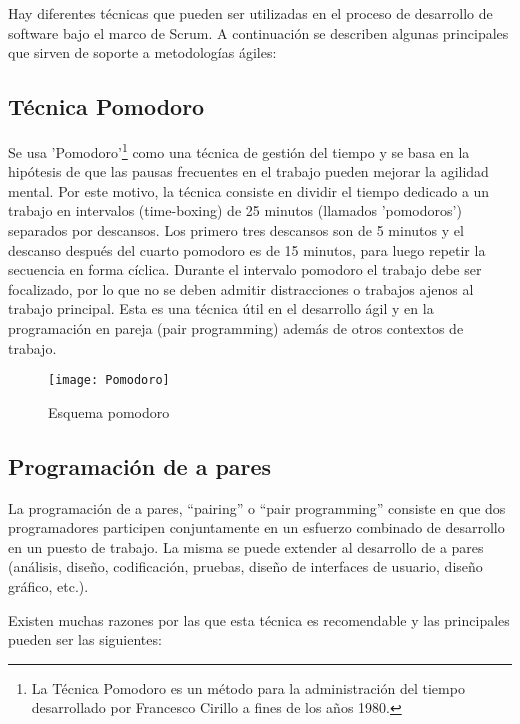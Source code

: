 Hay diferentes técnicas que pueden ser utilizadas en el proceso de desarrollo de software bajo el marco de Scrum. A continuación se describen algunas principales que sirven de soporte a metodologías ágiles:

\subsection{Técnica Pomodoro}

Se usa 'Pomodoro'\footnote{La Técnica Pomodoro es un método para la administración del tiempo desarrollado por Francesco Cirillo a fines de los años 1980\cite{Cirillo-Francesco-1980}.} como una técnica de gestión del tiempo y se basa en la hipótesis de que las pausas frecuentes en el trabajo pueden mejorar la agilidad mental. Por este motivo, la técnica consiste en dividir el tiempo dedicado a un trabajo en intervalos (time-boxing) de 25 minutos (llamados 'pomodoros') separados por descansos. Los primero tres descansos son de 5 minutos y el descanso después del cuarto pomodoro es de 15 minutos, para luego repetir la secuencia en forma cíclica. Durante el intervalo pomodoro el trabajo debe ser focalizado, por lo que no se deben admitir distracciones o trabajos ajenos al trabajo principal. 
Esta es una técnica útil en el desarrollo ágil y en la programación en pareja (pair programming) además de otros contextos de trabajo.

\begin{figure}[h]
  \centering
  \texttt{[image: Pomodoro]}
  \caption{Esquema pomodoro}
  \centering
  \label{fig:Pomodoro} %
\end{figure}

\subsection{Programación de a pares}

La programación de a pares, “pairing” o “pair programming” consiste en que dos programadores participen conjuntamente en un esfuerzo combinado de desarrollo en un puesto de trabajo. La misma se puede extender al desarrollo de a pares (análisis, diseño, codificación, pruebas, diseño de interfaces de usuario, diseño gráfico, etc.).

Existen muchas razones por las que esta técnica es recomendable y las principales pueden ser las siguientes:

